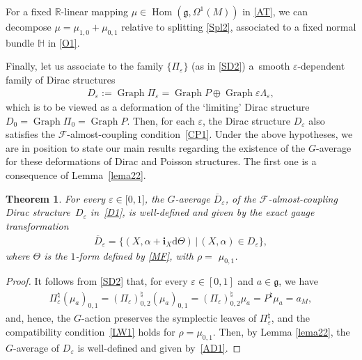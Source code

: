 \documentclass[pdftex]{sigma}
\numberwithin{equation}{section}
\newtheorem{Theorem}{Theorem}[section]
\begin{document}
For a f\/ixed $\mathbb{R}$-linear mapping
$\mu\in\operatorname*{Hom}(\mathfrak{g},\Omega^{1}(M))$ in \eqref{AT}, we can decompose $\mu=\mu_{1,0}+\mu_{0,1}$ relative to splitting \eqref{Spl2},
associated to a f\/ixed normal bundle $\mathbb{H}$ in \eqref{O1}.

Finally, let us associate to the family $\{\Pi_{\varepsilon}\}$ (as in \eqref{SD2}) a~smooth $\varepsilon$-dependent family of Dirac structures
\begin{gather}\label{D1}%
D_{\varepsilon}:=\operatorname*{Graph}\Pi_{\varepsilon}=\operatorname*{Graph} P\oplus\operatorname*{Graph}\varepsilon\Lambda_{\varepsilon},
\end{gather}
which is to be viewed as a deformation of the `limiting' Dirac structure $D_{0}=\operatorname*{Graph}\Pi_{0}=\operatorname*{Graph}P$. Then, for each
$\varepsilon$, the Dirac structure $D_{\varepsilon}$ also satisf\/ies the $\mathcal{F}$-almost-coupling condition~\eqref{CP1}. Under the above hypotheses, we are in position to state our main results regarding the existence of the $G$-average for these deformations of Dirac and Poisson structures. The f\/irst one is a consequence of Lemma~\ref{lema22}.
\begin{Theorem}
For every $\varepsilon\in\lbrack0,1]$, the $G$-average $\overline{D}_{\varepsilon}$, of the $\mathcal{F}$-almost-coupling Dirac structure~$D_{\varepsilon}$ in~\eqref{D1}, is well-defined and given by the exact gauge transformation
\begin{gather}\label{AD1}
\overline{D}_{\varepsilon}=\{(X,\alpha+\mathbf{i}_{X}\mathrm{d}\Theta)\,|\,(X,\alpha)\in D_{\varepsilon}\},
\end{gather}
where $\Theta$ is the $1$-form defined by \eqref{MF}, with $\rho=$ $\mu_{0,1}$.
\end{Theorem}
\begin{proof}
It follows from \eqref{SD2} that, for every $\varepsilon\in [0,1]$ and $a\in\mathfrak{g}$, we have
\begin{gather*}
\Pi_{\varepsilon}^{\natural}(\mu_{a})_{0,1}=(\Pi_{\varepsilon})_{0,2}^{\natural}(\mu_{a})_{0,1}=(\Pi_{\varepsilon})_{0,2}^{\natural}\mu
_{a}=P^{\natural}\mu_{a}=a_{M},
\end{gather*}
and, hence, the $G$-action preserves the symplectic leaves of $\Pi_{\varepsilon}^{\natural}$, and the compatibility condition~\eqref{LW1} holds for
$\rho=\mu_{0,1}$. Then, by Lemma \ref{lema22}, the $G$-average of $D_{\varepsilon}$ is well-def\/ined and given by~\eqref{AD1}.
\end{proof}
\end{document}
